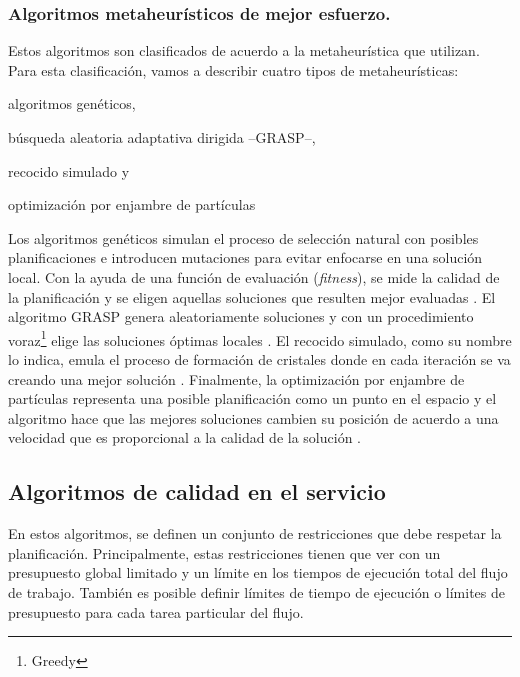 \subsubsection{Algoritmos metaheurísticos de mejor esfuerzo.}

Estos algoritmos son clasificados de acuerdo a la metaheurística que utilizan. Para esta clasificación, vamos a describir cuatro tipos de metaheurísticas: 
\begin{enumerate*}[label=\alph*)]
\item{algoritmos genéticos,}
\item{búsqueda aleatoria adaptativa dirigida --GRASP--,}
\item{recocido simulado y}
\item{optimización por enjambre de partículas}
\end{enumerate*}

Los algoritmos genéticos simulan el proceso de selección natural con posibles planificaciones e introducen mutaciones para evitar enfocarse en una solución local. Con la ayuda de una función de evaluación (\emph{fitness}), se mide la calidad de la planificación y se eligen aquellas soluciones que resulten mejor evaluadas \cite{yu2006scheduling}. El algoritmo GRASP \cite{blythe2005task} genera aleatoriamente soluciones y con un procedimiento voraz\footnote{Greedy} elige las soluciones óptimas locales \cite{blythe2005task}. El recocido simulado, como su nombre lo indica, emula el proceso de formación de cristales donde en cada iteración se va creando una mejor solución \cite{young2003scheduling}. Finalmente, la optimización por enjambre de partículas representa una posible planificación como un punto en el espacio y el algoritmo hace que las mejores soluciones cambien su posición de acuerdo a una velocidad que es proporcional a la calidad de la solución \cite{wu2010revised}.


\subsection{Algoritmos de calidad en el servicio}

En estos algoritmos, se definen un conjunto de restricciones que debe respetar la planificación. Principalmente, estas restricciones tienen que ver con un presupuesto global limitado y un límite en los tiempos de ejecución total del flujo de trabajo. También es posible definir límites de tiempo de ejecución o límites de presupuesto para cada tarea particular del flujo.

